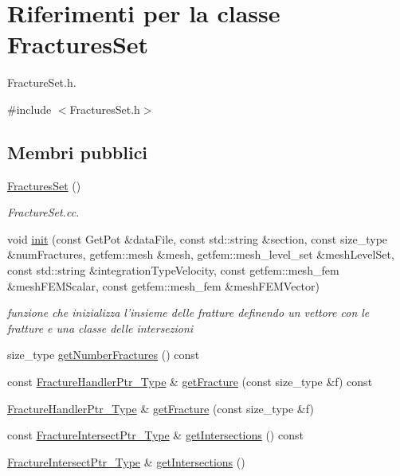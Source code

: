 \hypertarget{classFracturesSet}{\section{Riferimenti per la classe Fractures\-Set}
\label{classFracturesSet}
}


Fracture\-Set.\-h.  




{\ttfamily \#include $<$Fractures\-Set.\-h$>$}

\subsection*{Membri pubblici}
\begin{DoxyCompactItemize}
\item 
\hyperlink{classFracturesSet_a01682537586e273be19fd789c99cfa87}{Fractures\-Set} ()
\begin{DoxyCompactList}\small\item\em Fracture\-Set.\-cc. \end{DoxyCompactList}\item 
void \hyperlink{classFracturesSet_a451f55adca2cd36076294c3c3d2d5b6d}{init} (const Get\-Pot \&data\-File, const std\-::string \&section, const size\-\_\-type \&num\-Fractures, getfem\-::mesh \&mesh, getfem\-::mesh\-\_\-level\-\_\-set \&mesh\-Level\-Set, const std\-::string \&integration\-Type\-Velocity, const getfem\-::mesh\-\_\-fem \&mesh\-F\-E\-M\-Scalar, const getfem\-::mesh\-\_\-fem \&mesh\-F\-E\-M\-Vector)
\begin{DoxyCompactList}\small\item\em funzione che inizializza l'insieme delle fratture definendo un vettore con le fratture e una classe delle intersezioni \end{DoxyCompactList}\item 
size\-\_\-type \hyperlink{classFracturesSet_ad0d608408d6b65c83c2eb013d4daacdf}{get\-Number\-Fractures} () const 
\item 
const \hyperlink{FractureHandler_8h_af23fb7a30aaff864bd42587af4f1e78a}{Fracture\-Handler\-Ptr\-\_\-\-Type} \& \hyperlink{classFracturesSet_afa7100ac44d32e51e193380bf6d9d5f9}{get\-Fracture} (const size\-\_\-type \&f) const 
\item 
\hyperlink{FractureHandler_8h_af23fb7a30aaff864bd42587af4f1e78a}{Fracture\-Handler\-Ptr\-\_\-\-Type} \& \hyperlink{classFracturesSet_a12773c5c1e5a11703ed905ea6e47fcae}{get\-Fracture} (const size\-\_\-type \&f)
\item 
const \hyperlink{FractureIntersect_8h_a5486417d11465ffafe3034ce22c1c85b}{Fracture\-Intersect\-Ptr\-\_\-\-Type} \& \hyperlink{classFracturesSet_ae1d7e53adc5d8acaad0a37dd227aee03}{get\-Intersections} () const 
\item 
\hyperlink{FractureIntersect_8h_a5486417d11465ffafe3034ce22c1c85b}{Fracture\-Intersect\-Ptr\-\_\-\-Type} \& \hyperlink{classFracturesSet_a36e5a26e790e439e3aa8e516838c28ce}{get\-Intersections} ()
\end{DoxyCompactItemize}



